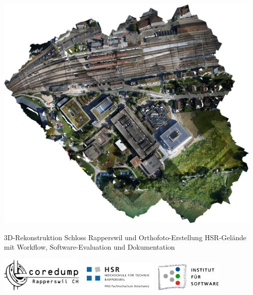 
\begin{titlepage}

\begin{addmargin}[-1cm]{-3cm}
\begin{center}
\large

\hfill

\begingroup
\color{Maroon}{\LARGE\spacedallcaps{\myTitle}}\\ \bigskip %
\endgroup

\spacedlowsmallcaps{\myName} \\
\spacedlowsmallcaps{\myHackerspace}

\vspace{15mm}

\includegraphics[width=13cm]{images/odm_orthophoto} \\ %

\vspace{12mm}

3D-Rekonstruktion Schloss Rapperswil und Orthofoto-Erstellung HSR-Gelände\\
mit Workflow, Software-Evaluation und Dokumentation

\bigskip

\myReportName

\vfill

\includegraphics[width=40mm]{images/coredump-logo.eps}
\quad\quad
\includegraphics[height=15mm]{images/HSR_Logo.pdf}
\quad\quad
\includegraphics[height=15mm]{images/ifs-logo}


\end{center}
\end{addmargin}
\end{titlepage}
